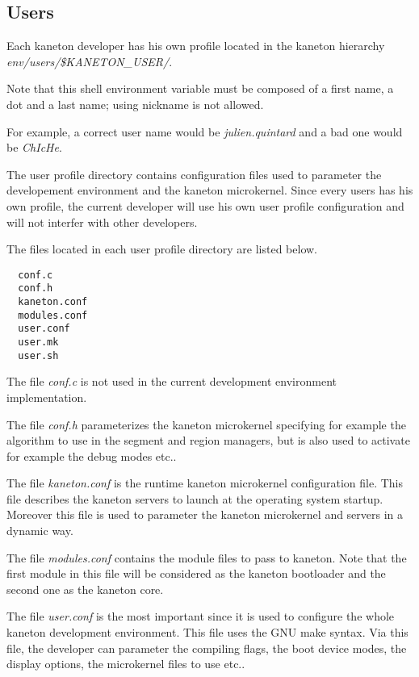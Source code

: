 %
%

\subsection{Users}

Each kaneton developer has his own profile located in the kaneton
hierarchy \textit{env/users/\$KANETON\_USER/}.

Note that this shell environment variable must be composed of a
first name, a dot and a last name; using nickname is not allowed.

For example, a correct user name would be \textit{julien.quintard} and
a bad one would be \textit{ChIcHe}.

The user profile directory contains configuration files used to parameter
the developement environment and the kaneton microkernel. Since every
users has his own profile, the current developer will use his own user
profile configuration and will not interfer with other developers.

The files located in each user profile directory are listed below.

\begin{verbatim}
  conf.c
  conf.h
  kaneton.conf
  modules.conf
  user.conf
  user.mk
  user.sh
\end{verbatim}

The file \textit{conf.c} is not used in the current development environment
implementation.

The file \textit{conf.h} parameterizes the kaneton microkernel specifying
for example the algorithm to use in the segment and region managers,
but is also used to activate for example the debug modes etc..

The file \textit{kaneton.conf} is the runtime kaneton microkernel
configuration file. This file describes the kaneton servers to launch
at the operating system startup. Moreover this file is used to parameter
the kaneton microkernel and servers in a dynamic way.

The file \textit{modules.conf} contains the module files to pass to
kaneton. Note that the first module in this file will be considered as
the kaneton bootloader and the second one as the kaneton core.

The file \textit{user.conf} is the most important since it is used
to configure the whole kaneton development environment. This file uses
the GNU make syntax. Via this file, the developer can parameter the compiling
flags, the boot device modes, the display options, the microkernel
files to use etc..

